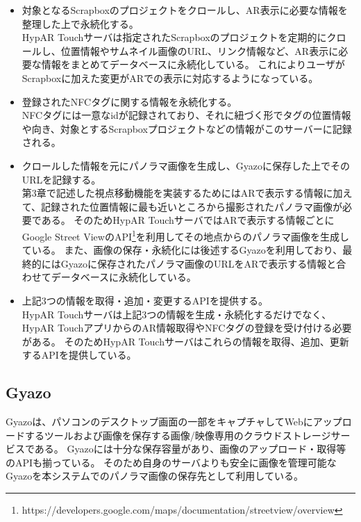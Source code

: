 \begin{itemize}
  \item 対象となるScrapboxのプロジェクトをクロールし、AR表示に必要な情報を整理した上で永続化する。\\
  HypAR Touchサーバは指定されたScrapboxのプロジェクトを定期的にクロールし、位置情報やサムネイル画像のURL、リンク情報など、AR表示に必要な情報をまとめてデータベースに永続化している。
  これによりユーザがScrapboxに加えた変更がARでの表示に対応するようになっている。
  \\
  \item 登録されたNFCタグに関する情報を永続化する。\\
  NFCタグには一意なidが記録されており、それに紐づく形でタグの位置情報や向き、対象とするScrapboxプロジェクトなどの情報がこのサーバーに記録される。
  \\
  \item クロールした情報を元にパノラマ画像を生成し、Gyazoに保存した上でそのURLを記録する。\\
  第3章で記述した視点移動機能を実装するためにはARで表示する情報に加えて、記録された位置情報に最も近いところから撮影されたパノラマ画像が必要である。
  そのためHypAR TouchサーバではARで表示する情報ごとにGoogle Street ViewのAPI\footnote{\textsf{https://developers.google.com/maps/documentation/streetview/overview}}を利用してその地点からのパノラマ画像を生成している。
  また、画像の保存・永続化には後述するGyazoを利用しており、最終的にはGyazoに保存されたパノラマ画像のURLをARで表示する情報と合わせてデータベースに永続化している。
  \\
  \item 上記3つの情報を取得・追加・変更するAPIを提供する。\\
  HypAR Touchサーバは上記3つの情報を生成・永続化するだけでなく、HypAR TouchアプリからのAR情報取得やNFCタグの登録を受け付ける必要がある。
  そのためHypAR Touchサーバはこれらの情報を取得、追加、更新するAPIを提供している。

\end{itemize}


\subsection{Gyazo}
Gyazoは、パソコンのデスクトップ画面の一部をキャプチャしてWebにアップロードするツールおよび画像を保存する画像/映像専用のクラウドストレージサービスである。
Gyazoには十分な保存容量があり、画像のアップロード・取得等のAPIも揃っている。
そのため自身のサーバよりも安全に画像を管理可能なGyazoを本システムでのパノラマ画像の保存先として利用している。

